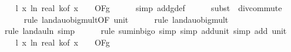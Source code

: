 \begin{isabellebody}
\isanewline
\ \ \isamarkupfalse%
\ l{}{\isacharcolon}{\kern0pt}\ {\isachardoublequoteopen}{\isacharparenleft}{\kern0pt}{\isasymlambda}x{\isachardot}{\kern0pt}\ ln\ {\isacharparenleft}{\kern0pt}real\ {\isacharparenleft}{\kern0pt}k{\isacharunderscore}{\kern0pt}of\ x{\isacharparenright}{\kern0pt}\ {\isacharplus}{\kern0pt}\ {}{\isacharparenright}{\kern0pt}{\isacharparenright}{\kern0pt}\ {\isasymin}\ O{\isacharbrackleft}{\kern0pt}{\isacharquery}{\kern0pt}F{\isacharbrackright}{\kern0pt}{\isacharparenleft}{\kern0pt}g{}{\isacharparenright}{\kern0pt}{\isachardoublequoteclose}\isanewline
\ \ \ \ \isamarkupfalse%
\ {\isacharparenleft}{\kern0pt}simp\ add{\isacharcolon}{\kern0pt}g{}{\isacharunderscore}{\kern0pt}def{\isacharparenright}{\kern0pt}\isanewline
\ \ \ \ \isamarkupfalse%
\ {\isacharparenleft}{\kern0pt}subst\ {\isacharparenleft}{\kern0pt}{}{\isacharparenright}{\kern0pt}\ div{\isacharunderscore}{\kern0pt}commute{\isacharparenright}{\kern0pt}\isanewline
\ \ \ \ \isamarkupfalse%
\ {\isacharparenleft}{\kern0pt}rule\ landau{\isacharunderscore}{\kern0pt}o{\isachardot}{\kern0pt}big{\isacharunderscore}{\kern0pt}mult{\isacharunderscore}{\kern0pt}{}{\isacharprime}{\kern0pt}{\isacharbrackleft}{\kern0pt}OF\ unit{\isacharunderscore}{\kern0pt}{}{\isacharbrackright}{\kern0pt}{\isacharparenright}{\kern0pt}\isanewline
\ \ \ \ \isamarkupfalse%
\ {\isacharparenleft}{\kern0pt}rule\ landau{\isacharunderscore}{\kern0pt}o{\isachardot}{\kern0pt}big{\isacharunderscore}{\kern0pt}mult{\isacharunderscore}{\kern0pt}{}{\isacharparenright}{\kern0pt}\isanewline
\ \ \ \ \ \isamarkupfalse%
\ {\isacharparenleft}{\kern0pt}rule\ landau{\isacharunderscore}{\kern0pt}ln{\isacharunderscore}{\kern0pt}{}{\isacharcomma}{\kern0pt}\ simp{\isacharparenright}{\kern0pt}\isanewline
\ \ \ \ \isamarkupfalse%
\ {\isacharparenleft}{\kern0pt}rule\ sum{\isacharunderscore}{\kern0pt}in{\isacharunderscore}{\kern0pt}bigo{\isacharcomma}{\kern0pt}\ simp{\isacharcomma}{\kern0pt}\ simp\ add{\isacharcolon}{\kern0pt}unit{\isacharunderscore}{\kern0pt}{}{\isacharcomma}{\kern0pt}\ simp\ add{\isacharcolon}{\kern0pt}\ unit{\isacharunderscore}{\kern0pt}{}{\isacharparenright}{\kern0pt}\isanewline
\isanewline
\ \ \isamarkupfalse%
\ l{}{\isacharcolon}{\kern0pt}\ {\isachardoublequoteopen}{\isacharparenleft}{\kern0pt}{\isasymlambda}x{\isachardot}{\kern0pt}\ ln\ {\isacharparenleft}{\kern0pt}real\ {\isacharparenleft}{\kern0pt}k{\isacharunderscore}{\kern0pt}of\ x{\isacharparenright}{\kern0pt}\ {\isacharplus}{\kern0pt}\ {}{\isacharparenright}{\kern0pt}{\isacharparenright}{\kern0pt}\ {\isasymin}\ O{\isacharbrackleft}{\kern0pt}{\isacharquery}{\kern0pt}F{\isacharbrackright}{\kern0pt}{\isacharparenleft}{\kern0pt}g{\isacharparenright}{\kern0pt}{\isachardoublequoteclose}\isanewline

\end{isabellebody}
